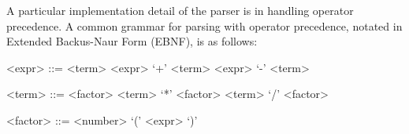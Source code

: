 


A particular implementation detail of the parser is in handling operator precedence. A common
grammar for parsing with operator precedence, notated in Extended Backus-Naur Form (EBNF), is as
follows:

\begin{center}
    \begin{grammar}
        <expr> ::= <term>
        \alt <expr> `+' <term>
        \alt <expr> `-' <term>

        <term> ::= <factor>
        \alt <term> `*' <factor>
        \alt <term> `/' <factor>

        <factor> ::= <number>
        \alt `(' <expr> `)'
    \end{grammar}
\end{center}


